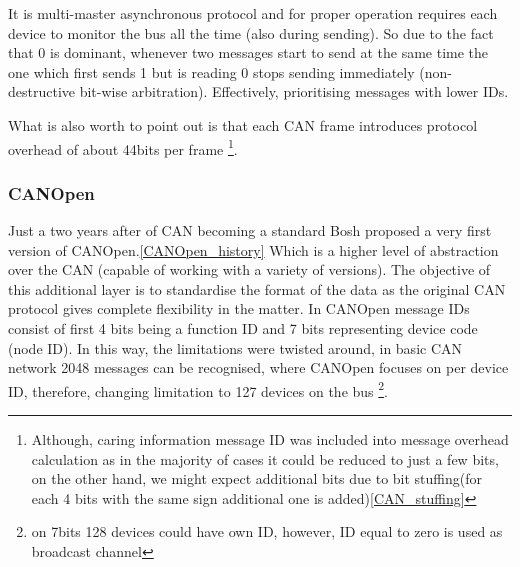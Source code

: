 It is multi-master asynchronous protocol and for proper operation requires each device to monitor the bus all the time (also during sending). So due to the fact that 0 is dominant, whenever two messages start to send at the same time the one which first sends 1 but is reading 0 stops sending immediately (non-destructive bit-wise arbitration). Effectively, prioritising messages with lower IDs.

What is also worth to point out is that each CAN frame introduces protocol overhead of about 44bits per frame \footnote{Although, caring information message ID was included into message overhead calculation as in the majority of cases it could be reduced to just a few bits, on the other hand, we might expect additional bits due to bit stuffing(for each 4 bits with the same sign additional one is added)\ref{CAN_stuffing}}.

\subsubsection{CANOpen}\label{can_subprotocol}
Just a two years after of CAN becoming a standard Bosh proposed a very first version of CANOpen.\ref{CANOpen_history}
Which is a higher level of abstraction over the CAN (capable of working with a variety of versions). The objective of this additional layer is to standardise the format of the data as the original CAN protocol gives complete flexibility in the matter. 
In CANOpen message IDs consist of first 4 bits being a function ID and 7 bits representing device code (node ID). In this way, the limitations were twisted around, in basic CAN network 2048 messages can be recognised, where CANOpen focuses on per device ID, therefore, changing limitation to 127 devices on the bus \footnote{on 7bits 128 devices could have own ID, however, ID equal to zero is used as broadcast channel}.

